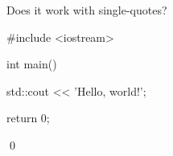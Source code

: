 Does it work with single-quotes?
\begin{console}
#include <iostream>

int main()
{
    std::cout << 'Hello, world!\n';

    return 0;
}
\end{console}
\qed
